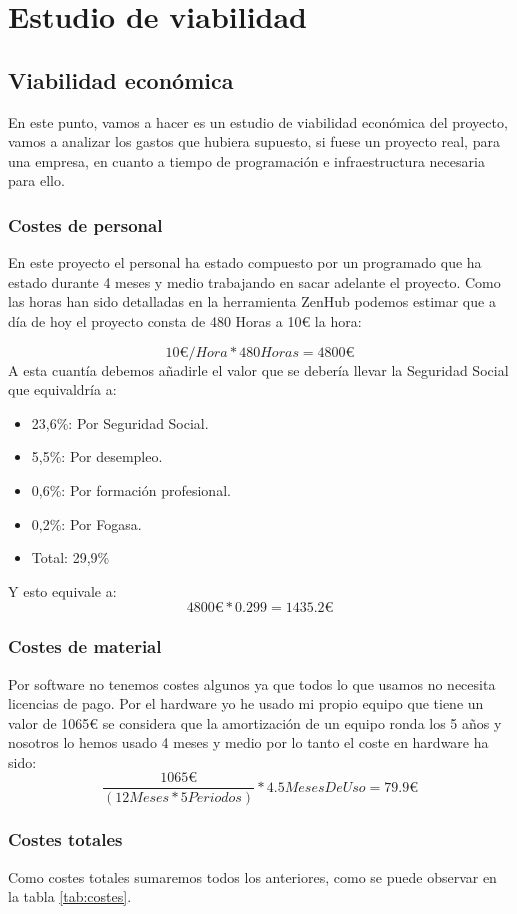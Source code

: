 \section{Estudio de viabilidad}

\subsection{Viabilidad económica}
En este punto, vamos a hacer es un estudio de viabilidad económica del proyecto, vamos a analizar los gastos que hubiera supuesto, si fuese un proyecto real, para una empresa, en cuanto a tiempo de programación e infraestructura necesaria para ello.
\subsubsection{Costes de personal}
En este proyecto el personal ha estado compuesto por un programado que ha estado durante 4 meses y medio trabajando en sacar adelante el proyecto.
Como las horas han sido detalladas en la herramienta ZenHub podemos estimar que a día de hoy el proyecto consta de 480 Horas a 10\euro{} la hora:

\[10{\euro{}} /Hora*480Horas=4800{\euro{}} \]
A esta cuantía debemos añadirle el valor que se debería llevar la Seguridad Social que equivaldría a:
\begin{itemize}
\item 23,6\%: Por Seguridad Social.
\item 5,5\%: Por desempleo.
\item 0,6\%: Por formación profesional.
\item 0,2\%: Por Fogasa.
\item Total: 29,9\% 
\end{itemize}
Y esto equivale a: 
\[4800\euro{}*0.299=1435.2\euro{}\]
\subsubsection{Costes de material}
Por software no tenemos costes algunos ya que todos lo que usamos no necesita licencias de pago.
Por el hardware yo he usado mi propio equipo que tiene un valor de 1065\euro{} se considera que la amortización de un equipo ronda los 5 años y nosotros lo hemos usado 4 meses y medio por lo tanto el coste en hardware ha sido: 
\[\frac{1065\euro{}}{(12Meses*5Periodos)}*4.5MesesDeUso=79.9\euro{}\]
\subsubsection{Costes totales}
Como costes totales sumaremos todos los anteriores, como se puede observar en la tabla \ref{tab:costes}.

